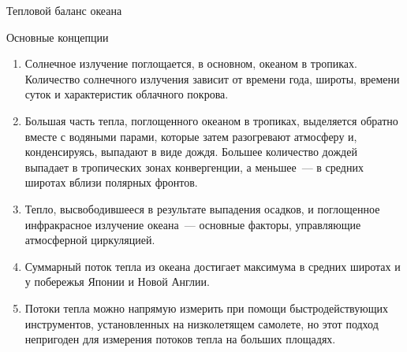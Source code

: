 \begin{chapter}{Тепловой баланс океана}
\begin{section}{Основные концепции}
\begin{enumerate}
\item 
Солнечное излучение поглощается, в основном, океаном в тропиках. Количество
солнечного излучения зависит от времени года, широты, времени суток и
характеристик облачного покрова.
%

\item
Большая часть тепла, поглощенного океаном в тропиках, выделяется обратно
вместе с водяными парами, которые затем разогревают атмосферу и, конденсируясь,
выпадают в виде дождя. Большее количество дождей выпадает в тропических зонах
конвергенции, а меньшее~--- в средних широтах вблизи полярных фронтов.
%

\item
Тепло, высвободившееся в результате выпадения осадков, и поглощенное 
инфракрасное излучение океана~--- основные факторы, управляющие атмосферной
циркуляцией.
%

\item
Суммарный поток тепла из океана достигает максимума в средних широтах и
у побережья Японии и Новой Англии.
%

\item
Потоки тепла можно напрямую измерить при помощи быстродействующих
инструментов, установленных на низколетящем самолете, но этот подход 
непригоден для измерения потоков тепла на больших площадях.
%


\end{enumerate}
\end{section}
\end{chapter}
